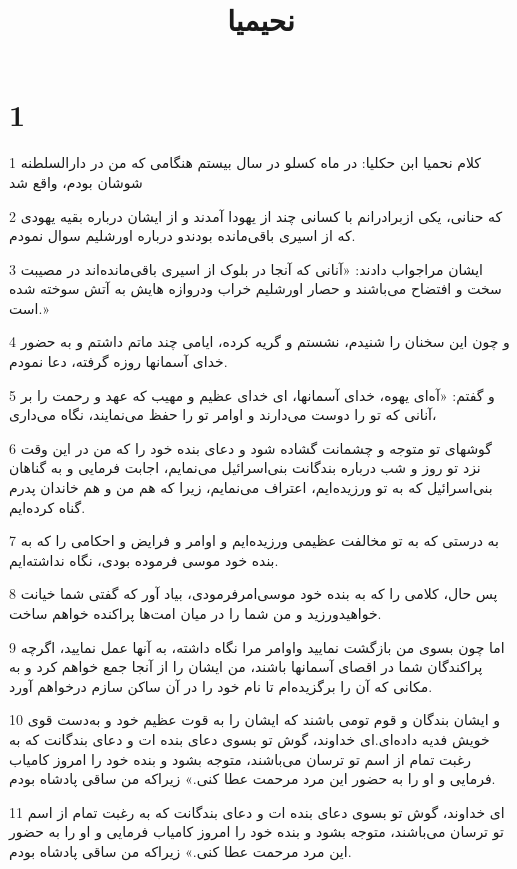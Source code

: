 

\title{نحيميا}

 
\chapter{1}

\par 1 کلام نحمیا ابن حکلیا: در ماه کسلو در سال بیستم هنگامی که من در دارالسلطنه شوشان بودم، واقع شد
\par 2 که حنانی، یکی ازبرادرانم با کسانی چند از یهودا آمدند و از ایشان درباره بقیه یهودی که از اسیری باقی‌مانده بودندو درباره اورشلیم سوال نمودم.
\par 3 ایشان مراجواب دادند: «آنانی که آنجا در بلوک از اسیری باقی‌مانده‌اند در مصیبت سخت و افتضاح می‌باشند و حصار اورشلیم خراب ودروازه هایش به آتش سوخته شده است.»
\par 4 و چون این سخنان را شنیدم، نشستم و گریه کرده، ایامی چند ماتم داشتم و به حضور خدای آسمانها روزه گرفته، دعا نمودم.
\par 5 و گفتم: «آه‌ای یهوه، خدای آسمانها، ای خدای عظیم و مهیب که عهد و رحمت را بر آنانی که تو را دوست می‌دارند و اوامر تو را حفظ می‌نمایند، نگاه می‌داری،
\par 6 گوشهای تو متوجه و چشمانت گشاده شود و دعای بنده خود را که من در این وقت نزد تو روز و شب درباره بندگانت بنی‌اسرائیل می‌نمایم، اجابت فرمایی و به گناهان بنی‌اسرائیل که به تو ورزیده‌ایم، اعتراف می‌نمایم، زیرا که هم من و هم خاندان پدرم گناه کرده‌ایم.
\par 7 به درستی که به تو مخالفت عظیمی ورزیده‌ایم و اوامر و فرایض و احکامی را که به بنده خود موسی فرموده بودی، نگاه نداشته‌ایم.
\par 8 پس حال، کلامی را که به بنده خود موسی‌امرفرمودی، بیاد آور که گفتی شما خیانت خواهیدورزید و من شما را در میان امت‌ها پراکنده خواهم ساخت.
\par 9 اما چون بسوی من بازگشت نمایید واوامر مرا نگاه داشته، به آنها عمل نمایید، اگر‌چه پراکندگان شما در اقصای آسمانها باشند، من ایشان را از آنجا جمع خواهم کرد و به مکانی که آن را برگزیده‌ام تا نام خود را در آن ساکن سازم درخواهم آورد.
\par 10 و ایشان بندگان و قوم تومی باشند که ایشان را به قوت عظیم خود و به‌دست قوی خویش فدیه داده‌ای.‌ای خداوند، گوش تو بسوی دعای بنده ات و دعای بندگانت که به رغبت تمام از اسم تو ترسان می‌باشند، متوجه بشود و بنده خود را امروز کامیاب فرمایی و او را به حضور این مرد مرحمت عطا کنی.» زیراکه من ساقی پادشاه بودم.
\par 11 ‌ای خداوند، گوش تو بسوی دعای بنده ات و دعای بندگانت که به رغبت تمام از اسم تو ترسان می‌باشند، متوجه بشود و بنده خود را امروز کامیاب فرمایی و او را به حضور این مرد مرحمت عطا کنی.» زیراکه من ساقی پادشاه بودم.
 
